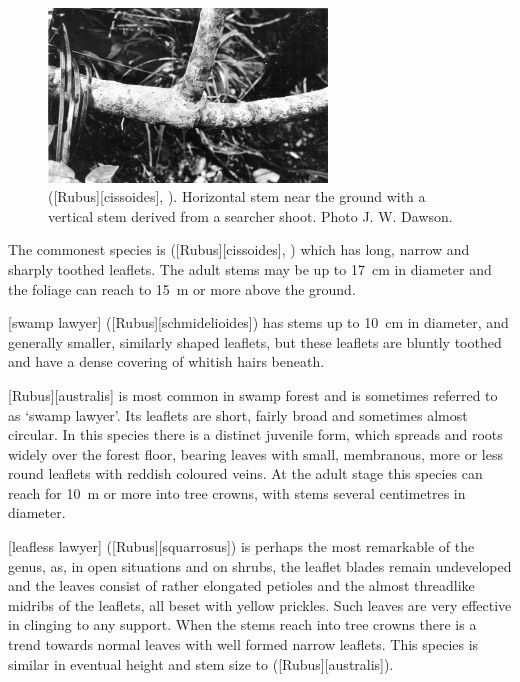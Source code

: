 \begin{figure}
	\includegraphics[width=0.66\textwidth]{graphics/fig_036}
	\centering
	\caption[Tataramoa, (bush lawyer)]{ ([Rubus][cissoides], ).
	Horizontal stem near the ground with a vertical stem derived from a searcher shoot.
	Photo  J. W. Dawson.}%
	\label{fig:36bushlawyer}
\end{figure}


The commonest species is  ([Rubus][cissoides], ) which has long, narrow and sharply toothed leaflets.
The adult stems may be up to \SI{17}{\centi\metre} in diameter and the foliage can reach to \SI{15}{\metre} or more above the ground.

[swamp lawyer] ([Rubus][schmidelioides]) has stems up to \SI{10}{\centi\metre} in diameter, and generally smaller, similarly shaped leaflets, but these leaflets are bluntly toothed and have a dense covering of whitish hairs beneath.

[Rubus][australis] is most common in swamp forest and is sometimes referred to as `swamp lawyer'.
Its leaflets are short, fairly broad and sometimes almost circular.
In this species there is a distinct juvenile form, which spreads and roots widely over the forest floor, bearing leaves with small, membranous, more or less round leaflets with reddish coloured veins.
At the adult stage this species can reach for \SI{10}{\metre} or more into tree crowns, with stems several centimetres in diameter.

[leafless lawyer] ([Rubus][squarrosus]) is perhaps the most remarkable of the genus, as, in open situations and on shrubs, the leaflet blades remain undeveloped and the leaves consist of rather elongated petioles and the almost threadlike midribs of the leaflets, all beset with yellow prickles.
Such leaves are very effective in clinging to any support.
When the stems reach into tree crowns there is a trend towards normal leaves with well formed narrow leaflets.
This species is similar in eventual height and stem size to  ([Rubus][australis]).


